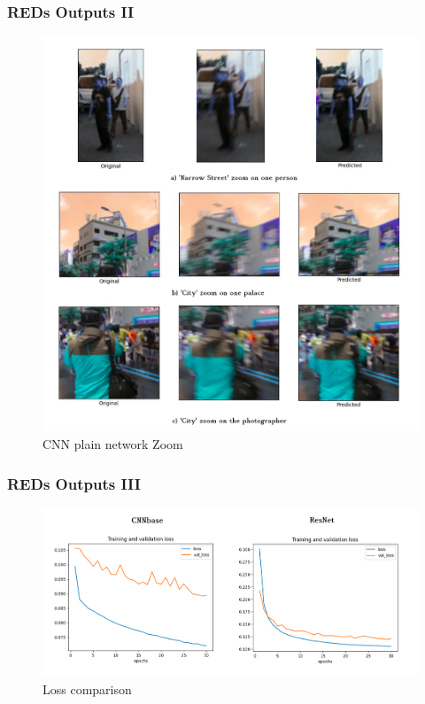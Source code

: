 \documentclass [handout] {beamer}
\begin{document}
	
\begin{frame}
	\frametitle{REDs Outputs II}
	\begin{figure}
		\centering
		\includegraphics[scale=0.22]{REDs_CNNBase_Outputs_Zoom.png} 
		\tiny{\caption{CNN plain network Zoom}}
	\end{figure}
\end{frame} 


\begin{frame}
	\frametitle{REDs Outputs III}
	\begin{figure}
		\centering
		\includegraphics[scale=0.3]{Loss_accuracy_comparison_REDs.png} 
		\tiny{\caption{Loss comparison}}
	\end{figure}
\end{frame}
\end{document}
